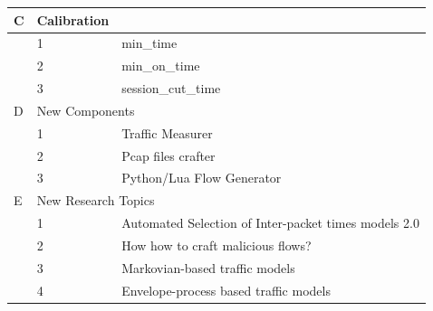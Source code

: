 \begin{table}[!ht]
\begin{tabular}{lll}
\rowcolor[HTML]{9B9B9B} 
C                                             & Calibration                &                                                                                    \\ \hline
                                              & 1                          & min\_time                                                                          \\
                                              & \cellcolor[HTML]{EFEFEF}2  & \cellcolor[HTML]{EFEFEF}min\_on\_time                                              \\
                                              & 3                          & session\_cut\_time                                                                 \\ \hline
\rowcolor[HTML]{9B9B9B} 
D                                             & \multicolumn{2}{l}{\cellcolor[HTML]{9B9B9B}New Components}                                                      \\ \hline
                                              & 1                          & Traffic Measurer                                                                      \\
                                              & \cellcolor[HTML]{EFEFEF}2  & \cellcolor[HTML]{EFEFEF}Pcap files crafter                                         \\
                                              & 3                          & Python/Lua Flow Generator                                                          \\ \hline
\rowcolor[HTML]{9B9B9B} 
E                                             & \multicolumn{2}{l}{\cellcolor[HTML]{9B9B9B}New Research Topics}                                                 \\ \hline
                                              & 1                          & Automated Selection of Inter-packet times models 2.0                               \\
                                              & \cellcolor[HTML]{EFEFEF}2  & \cellcolor[HTML]{EFEFEF}How how to craft malicious flows?                          \\
                                              & 3                          & Markovian-based traffic models                                \\
                                              & \cellcolor[HTML]{EFEFEF}4  & \cellcolor[HTML]{EFEFEF}Envelope-process based traffic models \\

\end{tabular}
\end{table}
